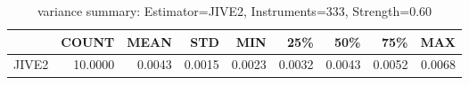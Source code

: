 \begin{table}[ht]
\centering
\caption{variance summary: Estimator=JIVE2, Instruments=333, Strength=0.60}
\begin{tabular}{lrrrrrrrr}
\toprule
 & COUNT & MEAN & STD & MIN & 25\% & 50\% & 75\% & MAX \\
\midrule
JIVE2 & 10.0000 & 0.0043 & 0.0015 & 0.0023 & 0.0032 & 0.0043 & 0.0052 & 0.0068 \\
\bottomrule
\end{tabular}
\end{table}
